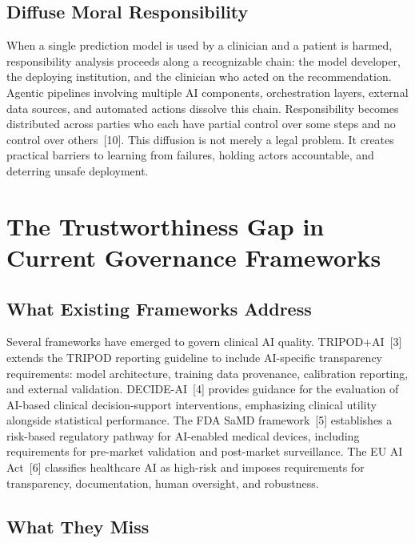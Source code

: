 \documentclass[11pt]{article}
\begin{document}
\subsection{Diffuse Moral
Responsibility}\label{diffuse-moral-responsibility}

When a single prediction model is used by a clinician and a patient is
harmed, responsibility analysis proceeds along a recognizable chain: the
model developer, the deploying institution, and the clinician who acted
on the recommendation. Agentic pipelines involving multiple AI
components, orchestration layers, external data sources, and automated
actions dissolve this chain. Responsibility becomes distributed across
parties who each have partial control over some steps and no control
over others~{[}10{]}. This diffusion is not merely a legal problem. It
creates practical barriers to learning from failures, holding actors
accountable, and deterring unsafe deployment.


\section{The Trustworthiness Gap in Current Governance
Frameworks}\label{the-trustworthiness-gap-in-current-governance-frameworks}

\subsection{What Existing Frameworks
Address}\label{what-existing-frameworks-address}

Several frameworks have emerged to govern clinical AI quality. TRIPOD+AI~{[}3{]}
extends the TRIPOD reporting guideline to include AI-specific
transparency requirements: model architecture, training data provenance,
calibration reporting, and external validation. DECIDE-AI~{[}4{]}
provides guidance for the evaluation of AI-based clinical
decision-support interventions, emphasizing clinical utility alongside
statistical performance. The FDA SaMD framework~{[}5{]} establishes a
risk-based regulatory pathway for AI-enabled medical devices, including
requirements for pre-market validation and post-market surveillance. The
EU AI Act~{[}6{]} classifies healthcare AI as high-risk and imposes
requirements for transparency, documentation, human oversight, and
robustness.

\subsection{What They Miss}\label{what-they-miss}
\end{document}
